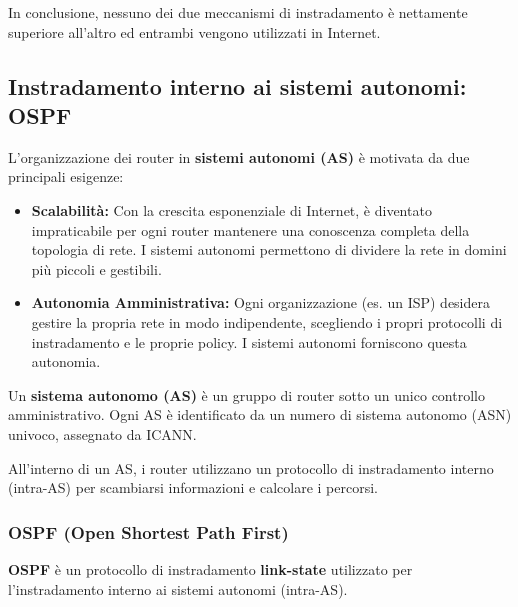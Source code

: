 In conclusione, nessuno dei due meccanismi di instradamento è nettamente superiore all'altro ed entrambi vengono utilizzati in Internet.

\subsection{Instradamento interno ai sistemi autonomi: OSPF}
L'organizzazione dei router in \textbf{sistemi autonomi (AS)} è motivata da due principali esigenze:
\begin{itemize}
    \item \textbf{Scalabilità:} Con la crescita esponenziale di Internet, è diventato impraticabile per ogni router mantenere una conoscenza completa della topologia di rete. I sistemi autonomi permettono di dividere la rete in domini più piccoli e gestibili.
    \item \textbf{Autonomia Amministrativa:} Ogni organizzazione (es. un ISP) desidera gestire la propria rete in modo indipendente, scegliendo i propri protocolli di instradamento e le proprie policy. I sistemi autonomi forniscono questa autonomia.
\end{itemize}

Un \textbf{sistema autonomo (AS)} è un gruppo di router sotto un unico controllo amministrativo. Ogni AS è identificato da un numero di sistema autonomo (ASN) univoco, assegnato da ICANN.

All'interno di un AS, i router utilizzano un protocollo di instradamento interno (intra-AS) per scambiarsi informazioni e calcolare i percorsi. 

\subsubsection*{OSPF (Open Shortest Path First)}
\textbf{OSPF} è un protocollo di instradamento \textbf{link-state} utilizzato per l'instradamento interno ai sistemi autonomi (intra-AS). 

